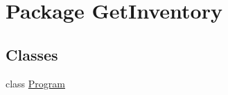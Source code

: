 \hypertarget{namespace_get_inventory}{\section{Package Get\-Inventory}
\label{namespace_get_inventory}
}
\subsection*{Classes}
\begin{DoxyCompactItemize}
\item 
class \hyperlink{class_get_inventory_1_1_program}{Program}
\end{DoxyCompactItemize}
